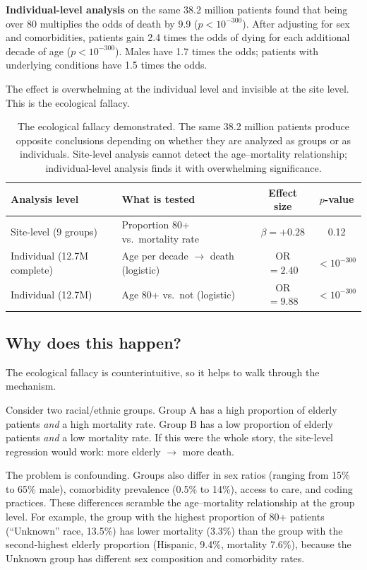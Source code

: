 \documentclass{article}
\begin{document}
\textbf{Individual-level analysis} on the same 38.2 million patients found
that being over 80 multiplies the odds of death by 9.9 ($p < 10^{-300}$).
After adjusting for sex and comorbidities, patients gain 2.4 times the odds of
dying for each additional decade of age ($p < 10^{-300}$).  Males have 1.7
times the odds; patients with underlying conditions have 1.5 times the odds.

The effect is overwhelming at the individual level and invisible at the site
level.  This is the ecological fallacy.

\begin{table}[t]
\centering
\caption{The ecological fallacy demonstrated.  The same 38.2 million patients
produce opposite conclusions depending on whether they are analyzed as groups
or as individuals.  Site-level analysis cannot detect the age--mortality
relationship; individual-level analysis finds it with overwhelming
significance.}
\label{tab:ecological}
\begin{tabular}{llcc}
\toprule
Analysis level & What is tested & Effect size & $p$-value \\
\midrule
Site-level (9 groups) & Proportion 80+ vs.\ mortality rate & $\beta = +0.28$ & 0.12 \\
Individual (12.7M complete) & Age per decade $\to$ death (logistic) & OR $= 2.40$ & $< 10^{-300}$ \\
Individual (12.7M) & Age 80+ vs.\ not (logistic) & OR $= 9.88$ & $< 10^{-300}$ \\
\bottomrule
\end{tabular}
\end{table}


\subsection{Why does this happen?}

The ecological fallacy is counterintuitive, so it helps to walk through the
mechanism.

Consider two racial/ethnic groups.  Group A has a high proportion of elderly
patients \emph{and} a high mortality rate.  Group B has a low proportion of
elderly patients \emph{and} a low mortality rate.  If this were the whole
story, the site-level regression would work: more elderly $\to$ more death.

The problem is confounding.  Groups also differ in sex ratios (ranging from
15\% to 65\% male), comorbidity prevalence (0.5\% to 14\%), access to care,
and coding practices.  These differences scramble the age--mortality
relationship at the group level.  For example, the group with the highest
proportion of 80+ patients (``Unknown'' race, 13.5\%) has lower mortality
(3.3\%) than the group with the second-highest elderly proportion (Hispanic,
9.4\%, mortality 7.6\%), because the Unknown group has different sex
composition and comorbidity rates.
\end{document}
